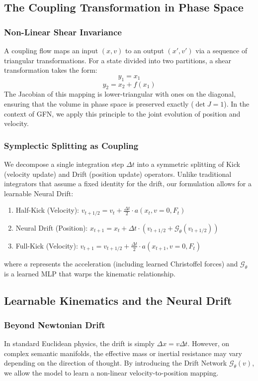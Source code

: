 \documentclass{article}
\numberwithin{equation}{section}
\begin{document}
\subsection{The Coupling Transformation in Phase Space}
\subsubsection{Non-Linear Shear Invariance}
A coupling flow maps an input $(x, v)$ to an output $(x', v')$ via a sequence of triangular transformations. For a state divided into two partitions, a shear transformation takes the form:
\[
y_1 = x_1
\]
\[
y_2 = x_2 + f(x_1)
\]
The Jacobian of this mapping is lower-triangular with ones on the diagonal, ensuring that the volume in phase space is preserved exactly ($\det J = 1$). In the context of GFN, we apply this principle to the joint evolution of position and velocity.

\subsubsection{Symplectic Splitting as Coupling}
We decompose a single integration step $\Delta t$ into a symmetric splitting of Kick (velocity update) and Drift (position update) operators. Unlike traditional integrators that assume a fixed identity for the drift, our formulation allows for a learnable Neural Drift:
\begin{enumerate}
\item Half-Kick (Velocity): $v_{t+1/2} = v_t + \frac{\Delta t}{2} \cdot a(x_t, v=0, F_t)$
\item Neural Drift (Position): $x_{t+1} = x_t + \Delta t \cdot (v_{t+1/2} + \mathcal{G}_\theta(v_{t+1/2}))$
\item Full-Kick (Velocity): $v_{t+1} = v_{t+1/2} + \frac{\Delta t}{2} \cdot a(x_{t+1}, v=0, F_t)$
\end{enumerate}
where $a$ represents the acceleration (including learned Christoffel forces) and $\mathcal{G}_\theta$ is a learned MLP that warps the kinematic relationship.

\subsection{Learnable Kinematics and the Neural Drift}
\subsubsection{Beyond Newtonian Drift}
In standard Euclidean physics, the drift is simply $\Delta x = v \Delta t$. However, on complex semantic manifolds, the effective mass or inertial resistance may vary depending on the direction of thought. By introducing the Drift Network $\mathcal{G}_\theta(v)$, we allow the model to learn a non-linear velocity-to-position mapping.
\end{document}
